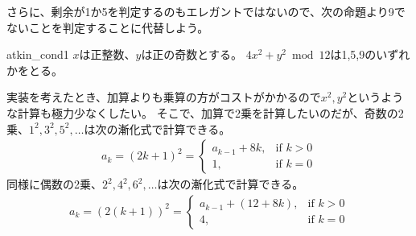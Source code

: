 さらに、剰余が1か5を判定するのもエレガントではないので、次の命題より9でないことを判定することに代替しよう。

\begin{Prop}{}{atkin_cond1}
$x$は正整数、$y$は正の奇数とする。
$4x^2+y^2 \bmod{12}$は1,5,9のいずれかをとる。
\end{Prop}

実装を考えたとき、加算よりも乗算の方がコストがかかるので$x^2,y^2$というような計算も極力少なくしたい。
そこで、加算で2乗を計算したいのだが、奇数の2乗、$1^2,3^2,5^2,\ldots$は次の漸化式で計算できる。
\begin{align*}
a_{k} = (2k+1)^2 =
\begin{cases}
a_{k-1} + 8k, &\mbox{if } k > 0\\
1, &\mbox{if } k = 0
\end{cases}
\end{align*}
同様に偶数の2乗、$2^2,4^2,6^2,\ldots$は次の漸化式で計算できる。
\begin{align*}
a_k = (2(k+1))^2 =
\begin{cases}
a_{k-1} + (12 + 8k), &\mbox{if } k > 0\\
4, &\mbox{if } k = 0
\end{cases}
\end{align*}


